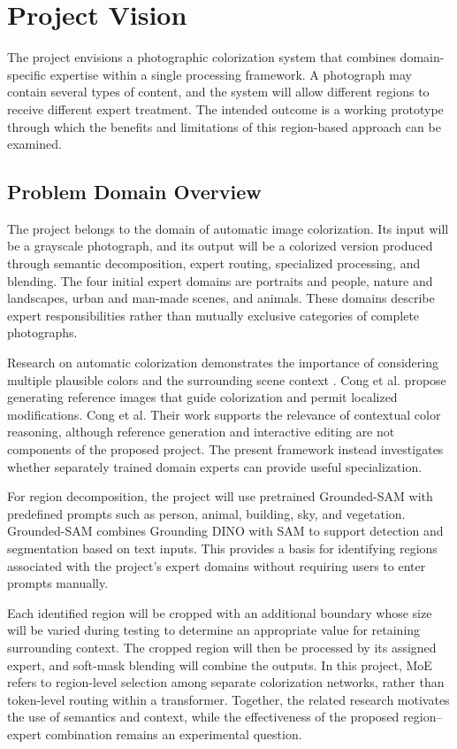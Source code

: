 \documentclass{FastFyp}
\begin{document}
\chapter{Project Vision}
The project envisions a photographic colorization system that combines domain-specific expertise within a single processing framework. A photograph may contain several types of content, and the system will allow different regions to receive different expert treatment. The intended outcome is a working prototype through which the benefits and limitations of this region-based approach can be examined.
\section{Problem Domain Overview}
The project belongs to the domain of automatic image colorization. Its input will be a grayscale photograph, and its output will be a colorized version produced through semantic decomposition, expert routing, specialized processing, and blending. The four initial expert domains are portraits and people, nature and landscapes, urban and man-made scenes, and animals. These domains describe expert responsibilities rather than mutually exclusive categories of complete photographs.

Research on automatic colorization demonstrates the importance of considering multiple plausible colors and the surrounding scene context \cite{ref1,ref11}. Cong et al. \cite{ref11} propose generating reference images that guide colorization and permit localized modifications. Cong et al. Their work supports the relevance of contextual color reasoning, although reference generation and interactive editing are not components of the proposed project. The present framework instead investigates whether separately trained domain experts can provide useful specialization.

For region decomposition, the project will use pretrained Grounded-SAM \cite{ref17} with predefined prompts such as person, animal, building, sky, and vegetation. Grounded-SAM combines Grounding DINO \cite{liu2024groundingdino} with SAM \cite{kirillov2023sam} to support detection and segmentation based on text inputs. This provides a basis for identifying regions associated with the project's expert domains without requiring users to enter prompts manually.

Each identified region will be cropped with an additional boundary whose size will be varied during testing to determine an appropriate value for retaining surrounding context. The cropped region will then be processed by its assigned expert, and soft-mask blending will combine the outputs. In this project, MoE refers to region-level selection among separate colorization networks, rather than token-level routing within a transformer. Together, the related research motivates the use of semantics and context, while the effectiveness of the proposed region--expert combination remains an experimental question.
\end{document}
